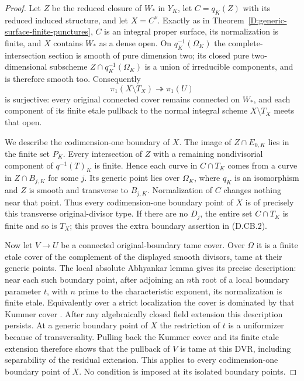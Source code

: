 \begin{proof}
Let $Z$ be the reduced closure of $W_*$ in $Y_K$, let $C=q_K(Z)$
with its reduced induced structure, and let $X=C^\nu$. Exactly as in
Theorem~\ref{D:generic-surface-finite-punctures}, $C$ is an integral
proper surface, its normalization is finite, and $X$ contains $W_*$
as a dense open. On $q_K^{-1}(\Omega_K)$ the complete-intersection
section is smooth of pure dimension two; its closed pure
two-dimensional subscheme $Z\cap q_K^{-1}(\Omega_K)$ is a union of
irreducible components, and is therefore smooth too. Consequently
\[
                  \pi_1(X\setminus T_X)\twoheadrightarrow\pi_1(U)
                  \tag{D.CB.3}
\]
is surjective: every original connected cover remains connected on
$W_*$, and each component of its finite etale pullback to the normal
integral scheme $X\setminus T_X$ meets that open.

We describe the codimension-one boundary of $X$. The image of
$Z\cap E_{0,K}$ lies in the finite set $P_K$. Every intersection of
$Z$ with a remaining nondivisorial component of $q^{-1}(T)_K$ is
finite. Hence each curve in $C\cap T_K$ comes from a curve in
$Z\cap B_{j,K}$ for some $j$. Its generic point lies over $\Omega_K$,
where $q_K$ is an isomorphism and $Z$ is smooth and transverse to
$B_{j,K}$. Normalization of $C$ changes nothing near that point.
Thus every codimension-one boundary point of $X$ is of precisely this
transverse original-divisor type. If there are no $D_j$, the entire
set $C\cap T_K$ is finite and so is $T_X$; this proves the extra
boundary assertion in (D.CB.2).

Now let $V\to U$ be a connected original-boundary tame cover. Over
$\Omega$ it is a finite etale cover of the complement of the displayed
smooth divisors, tame at their generic points. The local absolute
Abhyankar lemma gives its precise description: near each such
boundary point, after adjoining an $n$th root of a local boundary
parameter $t$, with $n$ prime to the characteristic exponent, its
normalization is finite etale. Equivalently over a strict localization
the cover is dominated by that Kummer cover
\citep[Expose XIII, Propositions 5.1--5.2 and Corollary 5.3,
pp.~428--430]{C_SGA1}.
After any algebraically closed field extension this description
persists. At a generic boundary point of $X$ the restriction of $t$
is a uniformizer because of transversality. Pulling back the Kummer
cover and its finite etale extension therefore shows that the
pullback of $V$ is tame at this DVR, including separability of the
residual extension. This applies to every codimension-one boundary
point of $X$. No condition is imposed at its isolated boundary
points.


\end{proof}
